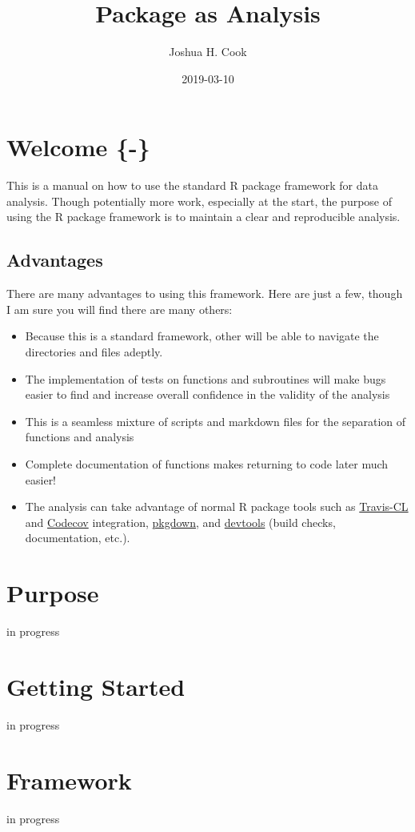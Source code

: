 \documentclass[]{book}
\title{Package as Analysis}
\author{Joshua H. Cook}
\date{2019-03-10}
\providecommand{\tightlist}{%
  \setlength{\itemsep}{0pt}\setlength{\parskip}{0pt}}
\begin{document}
\maketitle

{
\setcounter{tocdepth}{1}
\tableofcontents
}
\chapter{Welcome \{-\} }\label{welcome--}

This is a manual on how to use the standard R package framework for data
analysis. Though potentially more work, especially at the start, the
purpose of using the R package framework is to maintain a clear and
reproducible analysis.

\section{Advantages}\label{advantages}

There are many advantages to using this framework. Here are just a few,
though I am sure you will find there are many others:

\begin{itemize}
\tightlist
\item
  Because this is a standard framework, other will be able to navigate
  the directories and files adeptly.
\item
  The implementation of tests on functions and subroutines will make
  bugs easier to find and increase overall confidence in the validity of
  the analysis
\item
  This is a seamless mixture of scripts and markdown files for the
  separation of functions and analysis
\item
  Complete documentation of functions makes returning to code later much
  easier!
\item
  The analysis can take advantage of normal R package tools such as
  \href{https://travis-ci.org}{Travis-CL} and
  \href{https://codecov.io}{Codecov} integration,
  \href{https://pkgdown.r-lib.org}{pkgdown}, and
  \href{https://devtools.r-lib.org}{devtools} (build checks,
  documentation, etc.).
\end{itemize}

\chapter{Purpose}\label{purpose}

in progress

\chapter{Getting Started}\label{getting-started}

in progress

\chapter{Framework}\label{framework}

in progress


\end{document}
